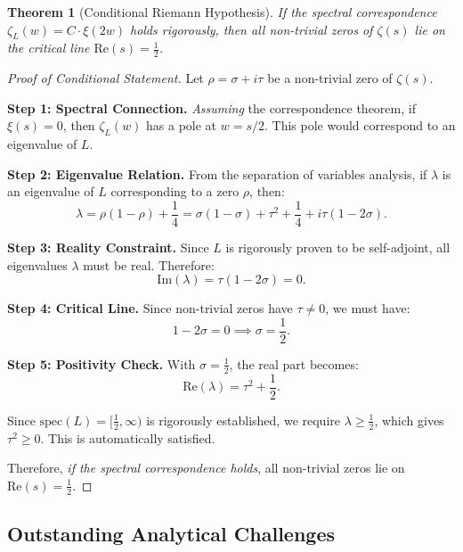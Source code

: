 \documentclass[12pt]{article}
\newtheorem{theorem}{Theorem}[section]
\begin{document}
\begin{theorem}[Conditional Riemann Hypothesis]
\textit{If} the spectral correspondence $\zeta_L(w) = C \cdot \xi(2w)$ holds rigorously, \textit{then} all non-trivial zeros of $\zeta(s)$ lie on the critical line $\text{Re}(s) = \frac{1}{2}$.
\end{theorem}

\begin{proof}[Proof of Conditional Statement]
Let $\rho = \sigma + i\tau$ be a non-trivial zero of $\zeta(s)$.

\textbf{Step 1: Spectral Connection.} \textit{Assuming} the correspondence theorem, if $\xi(s) = 0$, then $\zeta_L(w)$ has a pole at $w = s/2$. This pole would correspond to an eigenvalue of $L$.

\textbf{Step 2: Eigenvalue Relation.} From the separation of variables analysis, if $\lambda$ is an eigenvalue of $L$ corresponding to a zero $\rho$, then:
\begin{equation}
\lambda = \rho(1-\rho) + \frac{1}{4} = \sigma(1-\sigma) + \tau^2 + \frac{1}{4} + i\tau(1-2\sigma).
\end{equation}

\textbf{Step 3: Reality Constraint.} Since $L$ is rigorously proven to be self-adjoint, all eigenvalues $\lambda$ must be real. Therefore:
\begin{equation}
\text{Im}(\lambda) = \tau(1-2\sigma) = 0.
\end{equation}

\textbf{Step 4: Critical Line.} Since non-trivial zeros have $\tau \neq 0$, we must have:
\begin{equation}
1 - 2\sigma = 0 \implies \sigma = \frac{1}{2}.
\end{equation}

\textbf{Step 5: Positivity Check.} With $\sigma = \frac{1}{2}$, the real part becomes:
\begin{equation}
\text{Re}(\lambda) = \tau^2 + \frac{1}{2}.
\end{equation}

Since $\text{spec}(L) = [\frac{1}{2}, \infty)$ is rigorously established, we require $\lambda \geq \frac{1}{2}$, which gives $\tau^2 \geq 0$. This is automatically satisfied.

Therefore, \textit{if the spectral correspondence holds}, all non-trivial zeros lie on $\text{Re}(s) = \frac{1}{2}$.
\end{proof}

\subsection{Outstanding Analytical Challenges}
\end{document}
